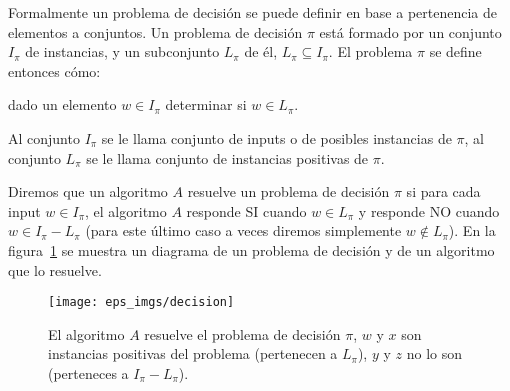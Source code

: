 \begin{definicion}
Formalmente un problema de decisión se puede definir en base a pertenencia de elementos a conjuntos.
Un problema de decisión $\pi$ está formado por un conjunto $I_\pi$ de instancias, y un subconjunto $L_\pi$ de él, $L_\pi\subseteq I_\pi$.
El problema $\pi$ se define entonces cómo:
\begin{center}dado un elemento $w\in I_\pi$ determinar si $w\in L_\pi$.\end{center}
Al conjunto $I_\pi$ se le llama conjunto de inputs o de posibles instancias de $\pi$, al conjunto $L_\pi$ se le llama conjunto de  instancias positivas de $\pi$.

Diremos que un algoritmo $A$ resuelve un problema de decisión $\pi$ si para cada input $w\in I_\pi$, el algoritmo $A$ responde SI cuando $w\in L_\pi$ y responde NO cuando $w\in I_\pi-L_\pi$ (para este último caso a veces diremos simplemente $w\notin L_\pi$).
En la figura~\ref{fig:decision} se muestra un diagrama de un problema de decisión y de un algoritmo que lo resuelve.
\begin{figure}[h!]
\centering
\texttt{[image: eps\_imgs/decision]}
\caption{El algoritmo $A$ resuelve el problema de decisión $\pi$, $w$ y $x$ son instancias positivas del problema (pertenecen a $L_\pi$), $y$ y $z$ no lo son (perteneces a $I_\pi-L_\pi$).}
\label{fig:decision}
\end{figure}
\end{definicion}

